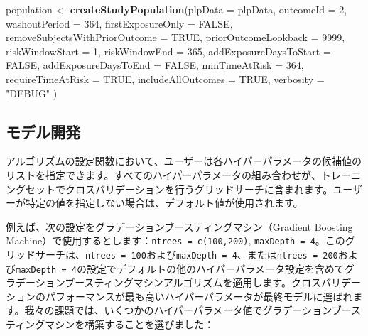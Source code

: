 \documentclass[
  11pt]{book}
\newenvironment{Shaded}{\begin{snugshade}}{\end{snugshade}}
\newcommand{\AttributeTok}[1]{\textcolor[rgb]{0.13,0.29,0.53}{#1}}
\newcommand{\ConstantTok}[1]{\textcolor[rgb]{0.56,0.35,0.01}{#1}}
\newcommand{\DecValTok}[1]{\textcolor[rgb]{0.00,0.00,0.81}{#1}}
\newcommand{\FunctionTok}[1]{\textcolor[rgb]{0.13,0.29,0.53}{\textbf{#1}}}
\newcommand{\NormalTok}[1]{#1}
\newcommand{\OtherTok}[1]{\textcolor[rgb]{0.56,0.35,0.01}{#1}}
\newcommand{\StringTok}[1]{\textcolor[rgb]{0.31,0.60,0.02}{#1}}
\theoremstyle{definition}
\theoremstyle{definition}
\theoremstyle{definition}
\theoremstyle{definition}
\theoremstyle{remark}
\begin{document}
\begin{Shaded}
\begin{Highlighting}[]
\NormalTok{population }\OtherTok{\textless{}{-}} \FunctionTok{createStudyPopulation}\NormalTok{(}\AttributeTok{plpData =}\NormalTok{ plpData,}
                                    \AttributeTok{outcomeId =} \DecValTok{2}\NormalTok{,}
                                    \AttributeTok{washoutPeriod =} \DecValTok{364}\NormalTok{,}
                                    \AttributeTok{firstExposureOnly =} \ConstantTok{FALSE}\NormalTok{,}
                                    \AttributeTok{removeSubjectsWithPriorOutcome =} \ConstantTok{TRUE}\NormalTok{,}
                                    \AttributeTok{priorOutcomeLookback =} \DecValTok{9999}\NormalTok{,}
                                    \AttributeTok{riskWindowStart =} \DecValTok{1}\NormalTok{,}
                                    \AttributeTok{riskWindowEnd =} \DecValTok{365}\NormalTok{,}
                                    \AttributeTok{addExposureDaysToStart =} \ConstantTok{FALSE}\NormalTok{,}
                                    \AttributeTok{addExposureDaysToEnd =} \ConstantTok{FALSE}\NormalTok{,}
                                    \AttributeTok{minTimeAtRisk =} \DecValTok{364}\NormalTok{,}
                                    \AttributeTok{requireTimeAtRisk =} \ConstantTok{TRUE}\NormalTok{,}
                                    \AttributeTok{includeAllOutcomes =} \ConstantTok{TRUE}\NormalTok{,}
                                    \AttributeTok{verbosity =} \StringTok{"DEBUG"}
\NormalTok{)}
\end{Highlighting}
\end{Shaded}

\subsection{モデル開発}\label{ux30e2ux30c7ux30ebux958bux767a}

アルゴリズムの設定関数において、ユーザーは各ハイパーパラメータの候補値のリストを指定できます。すべてのハイパーパラメータの組み合わせが、トレーニングセットでクロスバリデーションを行うグリッドサーチに含まれます。ユーザーが特定の値を指定しない場合は、デフォルト値が使用されます。

例えば、次の設定をグラデーションブースティングマシン（Gradient Boosting Machine）で使用するとします：\texttt{ntrees\ =\ c(100,200)}, \texttt{maxDepth\ =\ 4}。このグリッドサーチは、\texttt{ntrees\ =\ 100}および\texttt{maxDepth\ =\ 4}、または\texttt{ntrees\ =\ 200}および\texttt{maxDepth\ =\ 4}の設定でデフォルトの他のハイパーパラメータ設定を含めてグラデーションブースティングマシンアルゴリズムを適用します。クロスバリデーションのパフォーマンスが最も高いハイパーパラメータが最終モデルに選ばれます。我々の課題では、いくつかのハイパーパラメータ値でグラデーションブースティングマシンを構築することを選びました：
\end{document}
